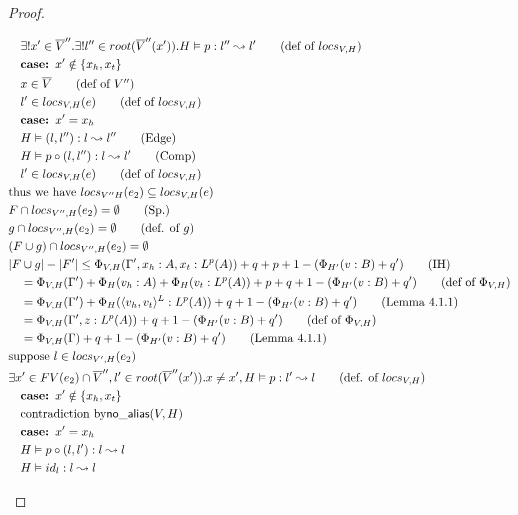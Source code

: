 \documentclass[11pt]{article}
\newcommand{\na}[2]{\mathsf{no\_alias}(#1,#2)}
\begin{document}
\begin{proof}
\begin{description}
\begin{align*}
  &\quad \exists! x' \in \overline V''. \exists! l'' \in root(\overline V''(x')). H \vDash p : l'' \leadsto l' \tag{def of $locs_{V,H}$}\\
  &\quad \textbf{case: } x' \notin \{x_h,x_t\}\\
  &\quad x \in \overline V \tag{def of $V''$}\\
  &\quad l' \in locs_{V,H}(e) \tag{def of $locs_{V,H}$}\\
  &\quad \textbf{case: } x' = x_h\\
  &\quad H \vDash (l,l'') : l \leadsto l'' \tag{Edge}\\
  &\quad H \vDash p \circ (l,l'') : l \leadsto l' \tag{Comp}\\
  &\quad l' \in locs_{V,H}(e) \tag{def of $locs_{V,H}$}\\
  &\text{thus we have } locs_{V''H}(e_2) \subseteq locs_{V,H}(e)\\
  &F \cap locs_{V'',H}(e_2) = \emptyset \tag{Sp.}\\
  &g \cap locs_{V'',H}(e_2) = \emptyset \tag{def. of $g$}\\
  &(F \cup g) \cap locs_{V'',H}(e_2) = \emptyset\\
  &|F \cup g| - |F'| \le  \Phi_{V,H}(\Gamma',x_h:A,x_t:L^p(A)) + q + p + 1 - (\Phi_{H'}(v:B) + q') \tag{IH}\\
  &\quad = \Phi_{V,H}(\Gamma') + \Phi_H(v_h:A) + \Phi_H(v_t:L^p(A)) + p + q + 1 - (\Phi_{H'}(v:B) + q') \tag{def of $\Phi_{V,H}$}\\
  &\quad = \Phi_{V,H}(\Gamma') + \Phi_H(\pairexcst{v_h}{v_t}^L : L^p(A)) + q + 1 - (\Phi_{H'}(v:B) + q') \tag{Lemma 4.1.1}\\
  &\quad = \Phi_{V,H}(\Gamma', z : L^p(A)) + q + 1 - (\Phi_{H'}(v:B) + q') \tag{def of $\Phi_{V,H}$}\\
  &\quad = \Phi_{V,H}(\Gamma) + q + 1 - (\Phi_{H'}(v:B) + q') \tag{Lemma 4.1.1}\\
  &\text{suppose } l \in locs_{V',H}(e_2) \\
  &\exists x' \in FV(e_2) \cap \overline V'', l' \in root(\overline V''(x')). x \ne x', H \vDash p : l' \leadsto l \tag{def. of $locs_{V,H}$}\\
  &\quad\textbf{case: } x' \notin \{x_h,x_t\}\\
  &\quad \text{contradiction by} \na{V}{H}\\ 
  &\quad\textbf{case: } x' = x_h\\
  &\quad H \vDash p \circ (l,l') : l \leadsto l\\
  &\quad H \vDash id_l : l \leadsto l\\

\end{align*}
\end{description}
\end{proof}
\end{document}
